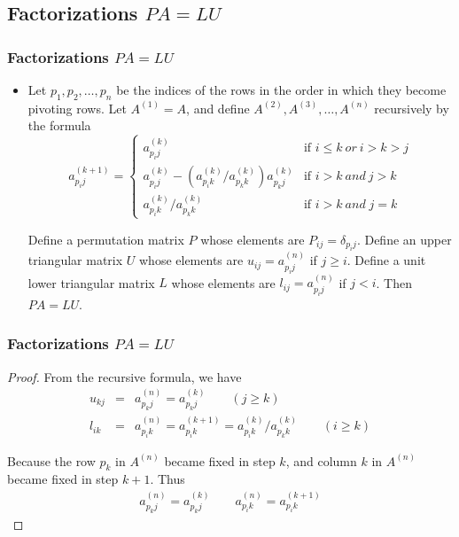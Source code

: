 \documentclass[notheorems,mathserif,table,compress]{beamer}  %
\begin{document}
\begin{frame}

\end{frame}

\subsection{Factorizations $PA=LU$}

\begin{frame}
\frametitle{Factorizations $PA=LU$} 
\begin{itemize}
\item Let $p_1, p_2,\ldots, p_n$ be the indices of the rows in the order in which they become pivoting rows. Let $A^{(1)}=A$, and define $A^{(2)}, A^{(3)},\ldots, A^{(n)}$ recursively by the formula
\begin{displaymath}
a_{p_ij}^{(k+1)}=\left\{ \begin{array}{ll}
a_{p_ij}^{(k)} & \textrm{if $i\leq k\ or\ i>k>j$}\\
a_{p_ij}^{(k)}-(a_{p_ik}^{(k)}/a_{p_kk}^{(k)})a_{p_kj}^{(k)} & \textrm{if $i>k\ and\ j>k$}\\
a_{p_ik}^{(k)}/a_{p_kk}^{(k)} & \textrm{if $i>k\ and\; j=k$}
\end{array} \right.
\end{displaymath}

\begin{theorem}
Define a permutation matrix $P$ whose elements are $P_{ij}=\delta_{p_ij}$. Define an upper triangular matrix $U$ whose elements are $u_{ij}=a_{p_ij}^{(n)}$ if $j\geq i$. Define a unit lower triangular matrix $L$ whose elements are $l_{ij}=a_{p_ij}^{(n)}$ if $j<i$. Then $PA=LU$.
\end{theorem}
\end{itemize}
\end{frame}

\begin{frame}
\frametitle{Factorizations $PA=LU$} 
\begin{proof}
From the recursive formula, we have 
\begin{eqnarray*}
u_{kj}&=&a_{p_kj}^{(n)}=a_{p_kj}^{(k)}\qquad (j\geq k)\\
l_{ik}&=&a_{p_ik}^{(n)}=a_{p_ik}^{(k+1)}=a_{p_ik}^{(k)}/a_{p_kk}^{(k)}\qquad (i\geq k)
\end{eqnarray*}

Because the row $p_k$ in $A^{(n)}$ became fixed in step $k$, and column $k$ in $A^{(n)}$ became fixed in step $k+1$. Thus
\begin{eqnarray*}
a_{p_kj}^{(n)}=a_{p_kj}^{(k)}\qquad a_{p_ik}^{(n)}=a_{p_ik}^{(k+1)}
\end{eqnarray*}
\end{proof}
\end{frame}
\end{document}
